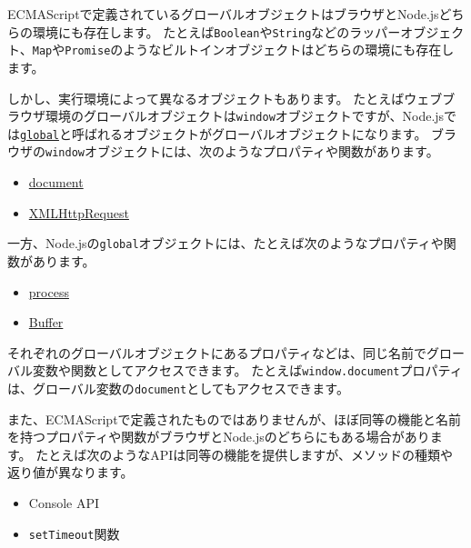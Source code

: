 ECMAScriptで定義されているグローバルオブジェクトはブラウザとNode.jsどちらの環境にも存在します。
たとえば\texttt{Boolean}や\texttt{String}などのラッパーオブジェクト、\texttt{Map}や\texttt{Promise}のようなビルトインオブジェクトはどちらの環境にも存在します。

しかし、実行環境によって異なるオブジェクトもあります。
たとえばウェブブラウザ環境のグローバルオブジェクトは\texttt{window}オブジェクトですが、Node.jsでは\href{https://nodejs.org/docs/latest-v18.x/api/globals.html}{\texttt{global}}と呼ばれるオブジェクトがグローバルオブジェクトになります。
ブラウザの\texttt{window}オブジェクトには、次のようなプロパティや関数があります。

\begin{itemize}
\item
  \href{https://developer.mozilla.org/ja/docs/Web/API/Document}{document}
\item
  \href{https://developer.mozilla.org/ja/docs/Web/API/XMLHttpRequest}{XMLHttpRequest}
\end{itemize}

一方、Node.jsの\texttt{global}オブジェクトには、たとえば次のようなプロパティや関数があります。

\begin{itemize}
\item
  \href{https://nodejs.org/docs/latest-v18.x/api/process.html\#process_process}{process}
\item
  \href{https://nodejs.org/docs/latest-v18.x/api/buffer.html}{Buffer}
\end{itemize}

それぞれのグローバルオブジェクトにあるプロパティなどは、同じ名前でグローバル変数や関数としてアクセスできます。
たとえば\texttt{window.document}プロパティは、グローバル変数の\texttt{document}としてもアクセスできます。

また、ECMAScriptで定義されたものではありませんが、ほぼ同等の機能と名前を持つプロパティや関数がブラウザとNode.jsのどちらにもある場合があります。
たとえば次のようなAPIは同等の機能を提供しますが、メソッドの種類や返り値が異なります。

\begin{itemize}
\item
  Console API
\item
  \texttt{setTimeout}関数
\end{itemize}

